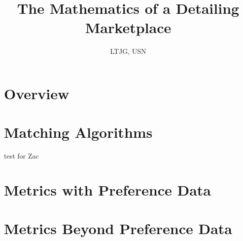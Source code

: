 \documentclass{article}
\title{The Mathematics of a Detailing Marketplace}
\author{\studentname \qquad LTJG, USN}
\begin{document}
\maketitle



\newpage

\tableofcontents

\newpage

\section{Overview}



\section{Matching Algorithms}
\label{Matching}





test for Zac



\section{Metrics with Preference Data}
\label{Metrics}









\section{Metrics Beyond Preference Data}
\label{Beyond}







\end{document}
